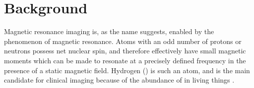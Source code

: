 \chapter{Background}
Magnetic resonance imaging is, as the name suggests, enabled by the phenomenon of magnetic resonance. Atoms with an odd
number of protons or neutrons possess net nuclear spin, and therefore effectively have small magnetic moments which can
be made to resonate at a precisely defined frequency in the presence of a static magnetic field. Hydrogen
() is such an atom, and is the main candidate for clinical imaging because of the abundance of  in
living things \cite{nishimura}.
